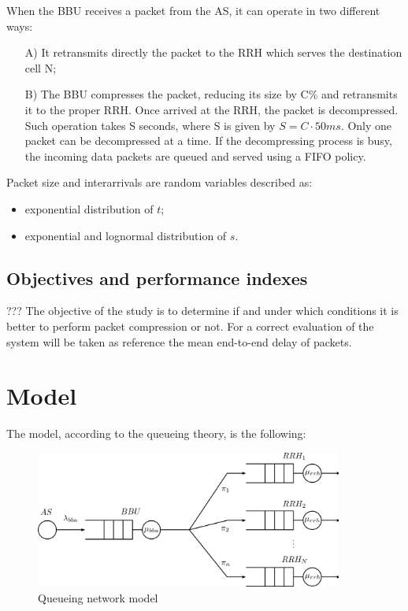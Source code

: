\documentclass[11pt,a4paper,oneside, openright]{article}
\begin{document}
When the BBU receives a packet from the AS, it can operate in two different ways:
\begin{itemize}
	\item[A)]It retransmits directly the packet to the RRH which serves the destination cell N;
	\item[B)]The BBU compresses the packet, reducing its size by C\% and retransmits it to the proper RRH. Once arrived at the RRH, the packet is decompressed. Such operation takes S seconds, where S is given by $ S = C \cdot 50ms $. Only one packet can be decompressed at a time. If the decompressing process is busy, the incoming data packets are queued and served using a FIFO policy.
\end{itemize}

Packet size and interarrivals are random variables described as:
\begin{itemize}
	\item exponential distribution of $t$;
	\item exponential and lognormal distribution of $s$.
\end{itemize}

\subsection{Objectives and performance indexes}
???
The objective of the study is to determine if and under which conditions it is better to perform packet compression or not.
For a correct evaluation of the system will be taken as reference the mean end-to-end delay of packets.

\newpage

\section{Model}
The model, according to the queueing theory, is the following:
\begin{figure}[h]
	\centering
	\includegraphics[width=0.9\textwidth]{images/model}
	\caption{Queueing network model}
	\label{fig:model}
\end{figure}
\end{document}
